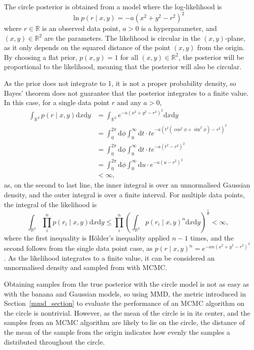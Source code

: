 \documentclass[english,twoside,openright]{HYgraduMLDS}
\newcommand{\R}{\mathbb{R}}
\newcommand{\dx}{\mathrm{d}}
\begin{document}
The circle posterior is obtained from a model where the log-likelihood is
\[
    \ln p(r\mid x, y) = -a(x^2 + y^2 - r^2)^2
\]
where \(r\in \R\) is an observed data point, \(a > 0\) is a hyperparameter,
and \((x, y)\in \R^{2}\) are the parameters.
The likelihood is circular in the \((x, y)\)-plane, as it only depends on the
squared distance of the point \((x, y)\) from the origin. By choosing a flat
prior, \(p(x, y) = 1\) for all \((x, y)\in \R^{2}\), the posterior will be
proportional to the likelihood, meaning that the posterior will also be circular.

As the prior does not integrate to 1, it is not a proper probability density,
so Bayes' theorem does not guarantee that the posterior integrates to a finite
value. In this case, for a single data point \(r\) and any \(a > 0\),
\begin{align*}
  \int_{\R^{2}}p(r\mid x, y)\dx x\dx y
  &= \int_{\R^{2}}e^{-a(x^{2} + y^{2} - r^{2})^{2}}\dx x\dx y
  \\&= \int_{0}^{2\pi}\dx \phi \int_{0}^{\infty}\dx t
  \cdot te^{-a(t^{2}(\cos^{2} \phi + \sin^{2} \phi) - r^{2})^{2}}
  \\&= \int_{0}^{2\pi}\dx \phi \int_{0}^{\infty}\dx t
  \cdot te^{-a(t^{2} - r^{2})^{2}}
  \\&= \int_{0}^{2\pi}\dx \phi \int_{0}^{\infty}\dx u\cdot e^{-a(u - r^{2})^{2}}
  \\&< \infty,
\end{align*}
as, on the second to last line, the inner integral is over an unnormalised
Gaussian density, and
the outer integral is over a finite interval. For multiple data points, the
integral of the likelihood is
\[
  \int_{\R^{2}}\prod_{i}^{n}p(r_{i}\mid x,y)\dx x\dx y
  \leq \prod_{i}^{n}\left(\int_{\R^{2}}p(r_{i}\mid x,y)^{n}\dx x\dx y\right)^{\frac{1}{n}}
  < \infty,
\]
where the first inequality is Hölder's inequality applied \(n - 1\) times,
and the second follows from the single data point case, as
\(p(r\mid x,y)^{n} = e^{-an(x^{2} + y^{2} - r^{2})^{2}}\).
As the likelihood integrates to a
finite value, it can be considered an unnormalised density and sampled from
with MCMC.

Obtaining samples from the true posterior with the circle model is not
as easy as with the banana and Gaussian models, so using MMD, the metric
introduced in Section~\ref{mmd_section} to evaluate
the performance of an MCMC algorithm on the circle is nontrivial. However,
as the mean of the circle is in its center, and the samples from an MCMC
algorithm are likely to lie on the circle, the distance of the mean of the
sample from the origin indicates how evenly the samples a distributed throughout
the circle.
\end{document}
